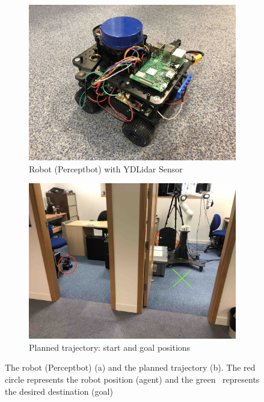 \begin{figure}[h!]
  \centering
  \begin{subfigure}[b]{0.47\linewidth}
    \includegraphics[width=\linewidth]{images/real/robo/preview.JPG}
     \caption{Robot (Perceptbot) with YDLidar Sensor \cite{robo}}
  \end{subfigure}
  \hfill
  \begin{subfigure}[b]{0.47\linewidth}
    \includegraphics[width=\linewidth]{images/real/robo/start_ann.JPG}
     \caption{Planned trajectory: start and goal positions}
  \end{subfigure}
  \caption{The robot (Perceptbot) (a) and the planned trajectory (b). The red circle represents the robot position (agent) and the green \xmark $\,$ represents the desired destination (goal)}
  \label{fig: robot}
\end{figure}

